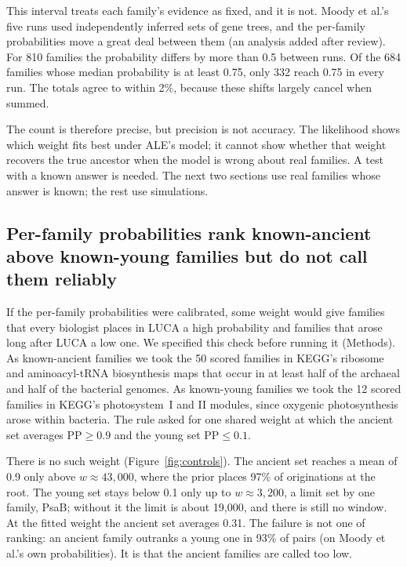 \documentclass[11pt]{article}
\newcommand{\PP}{\mathrm{PP}}
\begin{document}
This interval treats each family's evidence as fixed, and it is not. Moody et al.'s five runs used independently inferred sets of gene trees, and the per-family probabilities move a great deal between them (an analysis added after review). For 810 families the probability differs by more than 0.5 between runs. Of the 684 families whose median probability is at least 0.75, only 332 reach 0.75 in every run. The totals agree to within 2\%, because these shifts largely cancel when summed.

The count is therefore precise, but precision is not accuracy. The likelihood shows which weight fits best under ALE's model; it cannot show whether that weight recovers the true ancestor when the model is wrong about real families. A test with a known answer is needed. The next two sections use real families whose answer is known; the rest use simulations.

\subsection{Per-family probabilities rank known-ancient above known-young families but do not call them reliably}\label{sec:controls}
If the per-family probabilities were calibrated, some weight would give families that every biologist places in LUCA a high probability and families that arose long after LUCA a low one. We specified this check before running it (Methods). As known-ancient families we took the 50 scored families in KEGG's ribosome and aminoacyl-tRNA biosynthesis maps that occur in at least half of the archaeal and half of the bacterial genomes. As known-young families we took the 12 scored families in KEGG's photosystem~I and II modules, since oxygenic photosynthesis arose within bacteria. The rule asked for one shared weight at which the ancient set averages $\PP \ge 0.9$ and the young set $\PP \le 0.1$.

There is no such weight (Figure~\ref{fig:controls}). The ancient set reaches a mean of 0.9 only above $w \approx 43{,}000$, where the prior places 97\% of originations at the root. The young set stays below 0.1 only up to $w \approx 3{,}200$, a limit set by one family, PsaB; without it the limit is about 19,000, and there is still no window. At the fitted weight the ancient set averages 0.31. The failure is not one of ranking: an ancient family outranks a young one in 93\% of pairs (on Moody et al.'s own probabilities). It is that the ancient families are called too low.
\end{document}
